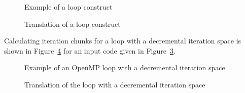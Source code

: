 \lstset{language=C,basicstyle=\scriptsize}
\begin{figure}[htbp]
{\indent
  {\mySmallFontSize
    \begin{latexonly}
    
    \end{latexonly}
    \begin{htmlonly}
    
    \end{htmlonly}
  }
}
\caption{Example of a loop construct}
\label{Manual:omp:ompfor}
\end{figure}

\begin{figure}[htbp]
{\indent
  {\mySmallFontSize
    \begin{latexonly}
    
    \end{latexonly}
    \begin{htmlonly}
    
    \end{htmlonly}
  }
}
\caption{Translation of a loop construct}
\label{Manual:omp:ompfor-trans}
\end{figure}

Calculating iteration chunks for a loop with a decremental iteration space is shown in 
Figure~\ref{Manual:omp:ompfor5-trans} for an input code given in
Figure~\ref{Manual:omp:ompfor5}. 

\lstset{language=C,basicstyle=\scriptsize}
\begin{figure}[htbp]
{\indent
  {\mySmallFontSize
    \begin{latexonly}
    
    \end{latexonly}
    \begin{htmlonly}
    
    \end{htmlonly}
  }
}
\caption{Example of an OpenMP loop with a decremental iteration space}
\label{Manual:omp:ompfor5}
\end{figure}

\begin{figure}[htbp]
{\indent
  {\mySmallFontSize
    \begin{latexonly}
    
    \end{latexonly}
    \begin{htmlonly}
    
    \end{htmlonly}
  }
}
\caption{Translation of the loop with a decremental iteration space}
\label{Manual:omp:ompfor5-trans}
\end{figure}

